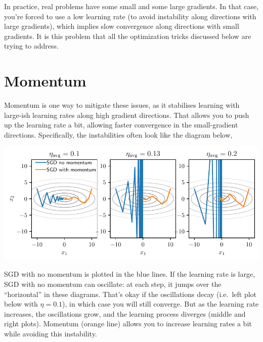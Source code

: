 \documentclass{article}
\newcommand{\0}{\mathbf{0}}
\begin{document}
In practice, real problems have some small and some large gradients.
In that case, you're forced to use a low learning rate (to avoid instability along directions with large gradients), which implies slow convergence along directions with small gradients.
It is this problem that all the optimization tricks discussed below are trying to address.

\section{Momentum}

Momentum is one way to mitigate these issues, as it stabilises learning with large-ish learning rates along high gradient directions.
That allows you to push up the learning rate a bit, allowing faster convergence in the small-gradient directions.
Specifically, the instabilities often look like the diagram below,
\begin{center}
  \includegraphics[width=\textwidth]{momentum.pdf}
\end{center}
SGD with no momentum is plotted in the blue lines.
If the learning rate is large, SGD with no momentum can oscillate: at each step, it jumps over the ``horizontal'' in these diagrams.
That's okay if the oscillations decay (i.e.\ left plot below with $\eta=0.1$), in which case you will still converge.
But as the learning rate increases, the oscillations grow, and the learning process diverges (middle and right plots).
Momentum (orange line) allows you to increase learning rates a bit while avoiding this instability.
\end{document}
